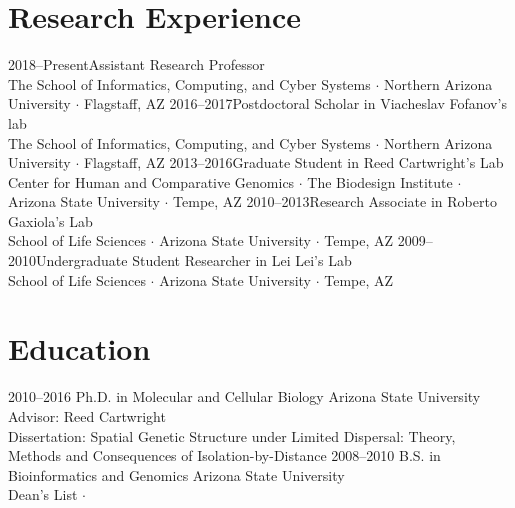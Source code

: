 \documentclass[]{cv-style}          %
\begin{document}
\section{Research Experience}
\begin{entrylist}
\entry
{2018--Present}{Assistant Research Professor}
{\\The School of Informatics, Computing, and Cyber Systems $\cdotp$ Northern Arizona University $\cdotp$ Flagstaff, AZ}{\vspace{-0.3cm}}
\entry
{2016--2017}{Postdoctoral Scholar {\normalfont in Viacheslav Fofanov's lab}}
{\\The School of Informatics, Computing, and Cyber Systems $\cdotp$ Northern Arizona University $\cdotp$ Flagstaff, AZ}{\vspace{-0.3cm}}
\entry
{2013--2016}{Graduate Student {\normalfont in Reed Cartwright's Lab}}
{\\Center for Human and Comparative Genomics $\cdotp$ The Biodesign Institute $\cdotp$ Arizona State University $\cdotp$ Tempe, AZ}{\vspace{-0.3cm}}
\entry
{2010--2013}{Research Associate {\normalfont in Roberto Gaxiola's Lab}}
{\\School of Life Sciences $\cdotp$ Arizona State University $\cdotp$ Tempe, AZ}
{\vspace{-0.3cm}}
\entry
{2009--2010}{Undergraduate Student Researcher {\normalfont in Lei Lei's Lab}}
{\\School of Life Sciences $\cdotp$ Arizona State University $\cdotp$ Tempe, AZ}
{\vspace{-0.3cm}}
\end{entrylist}

\section{Education}

\begin{entrylist}
\entry
{2010--2016}
{Ph.D. {\normalfont in Molecular and Cellular Biology}}
{Arizona State University\\
Advisor: Reed Cartwright\\
Dissertation: Spatial Genetic Structure under Limited Dispersal: Theory, Methods and Consequences of Isolation-by-Distance
}
{\vspace{-0.3cm}}
\entry
{2008--2010}
{B.S. {\normalfont in Bioinformatics and Genomics}}
{Arizona State University\\
Dean's List $\cdotp$  }{\vspace{-0.3cm}}
\end{entrylist}
\end{document}
